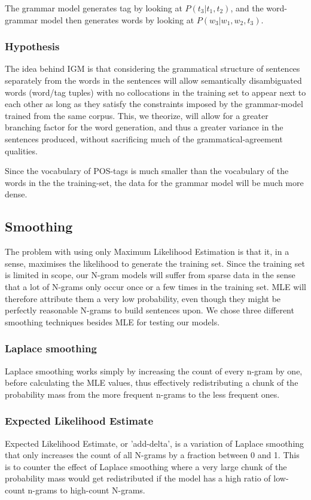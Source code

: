 \documentclass[a4paper,12pt]{article}
\begin{document}
The grammar model generates tag by looking at $P(t_3|t_1,t_2)$, and the word-grammar model then generates words by looking at $P(w_3|w_1,w_2,t_3)$.

\subsubsection{Hypothesis}
The idea behind IGM is that considering the grammatical structure of sentences separately from the words in the sentences will allow semantically disambiguated words (word/tag tuples) with no collocations in the training set to appear next to each other as long as they satisfy the constraints imposed by the grammar-model trained from the same corpus. This, we theorize, will allow for a greater branching factor for the word generation, and thus a greater variance in the sentences produced, without sacrificing much of the grammatical-agreement qualities.

Since the vocabulary of POS-tags is much smaller than the vocabulary of the words in the the training-set, the data for the grammar model will be much more dense.

\subsection{Smoothing}
\label{subsec:smoothing}

The problem with using only Maximum Likelihood Estimation is that it, in a sense, maximises the likelihood to generate the training set. Since the training set is limited in scope, our N-gram models will suffer from sparse data in the sense that a lot of N-grams only occur once or a few times in the training set. MLE will therefore attribute them a very low probability, even though they might be perfectly reasonable N-grams to build sentences upon. We chose three different smoothing techniques besides MLE for testing our models.

\subsubsection{Laplace smoothing}
Laplace smoothing works simply by increasing the count of every n-gram by one, before calculating the MLE values, thus effectively redistributing a chunk of the probability mass from the more frequent n-grams to the less frequent ones.

\subsubsection{Expected Likelihood Estimate}
Expected Likelihood Estimate, or 'add-delta', is a variation of Laplace smoothing that only increases the count of all N-grams by a fraction between 0 and 1. This is to counter the effect of Laplace smoothing where a very large chunk of the probability mass would get redistributed if the model has a high ratio of low-count n-grams to high-count N-grams.
\end{document}
